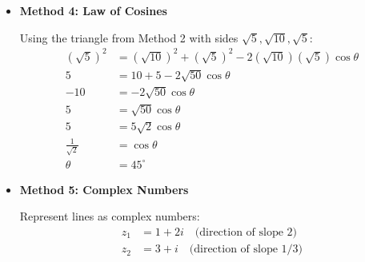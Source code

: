 \documentclass[12pt]{article}
\begin{document}
\begin{techniquesbox}
\begin{itemize}[leftmargin=*]
    Use direction vectors:
    \begin{align*}
    \vec{u} &= \langle 1, 2 \rangle \quad \text{(direction of line with slope 2)}\\
    \vec{v} &= \langle 3, 1 \rangle \quad \text{(direction of line with slope 1/3)}
    \end{align*}
    
    Calculate dot product and magnitudes:
    \begin{align*}
    \vec{u} \cdot \vec{v} &= 1(3) + 2(1) = 5\\
    |\vec{u}| &= \sqrt{1^2 + 2^2} = \sqrt{5}\\
    |\vec{v}| &= \sqrt{3^2 + 1^2} = \sqrt{10}
    \end{align*}
    
    Apply formula:
    \begin{align*}
    \cos\theta &= \frac{\vec{u} \cdot \vec{v}}{|\vec{u}||\vec{v}|} = \frac{5}{\sqrt{5}\sqrt{10}} = \frac{5}{\sqrt{50}} = \frac{5}{5\sqrt{2}} = \frac{1}{\sqrt{2}} = \frac{\sqrt{2}}{2}
    \end{align*}
    
    Therefore $\theta = 45^\circ$.
    
    \item \textbf{Method 4: Law of Cosines}
    
    Using the triangle from Method 2 with sides $\sqrt{5}, \sqrt{10}, \sqrt{5}$:
    \begin{align*}
    (\sqrt{5})^2 &= (\sqrt{10})^2 + (\sqrt{5})^2 - 2(\sqrt{10})(\sqrt{5})\cos\theta\\
    5 &= 10 + 5 - 2\sqrt{50}\cos\theta\\
    -10 &= -2\sqrt{50}\cos\theta\\
    5 &= \sqrt{50}\cos\theta\\
    5 &= 5\sqrt{2}\cos\theta\\
    \frac{1}{\sqrt{2}} &= \cos\theta\\
    \theta &= 45^\circ
    \end{align*}
    
    \item \textbf{Method 5: Complex Numbers}
    
    Represent lines as complex numbers:
    \begin{align*}
    z_1 &= 1 + 2i \quad \text{(direction of slope 2)}\\
    z_2 &= 3 + i \quad \text{(direction of slope 1/3)}
    \end{align*}
    

\end{itemize}
\end{techniquesbox}
\end{document}
